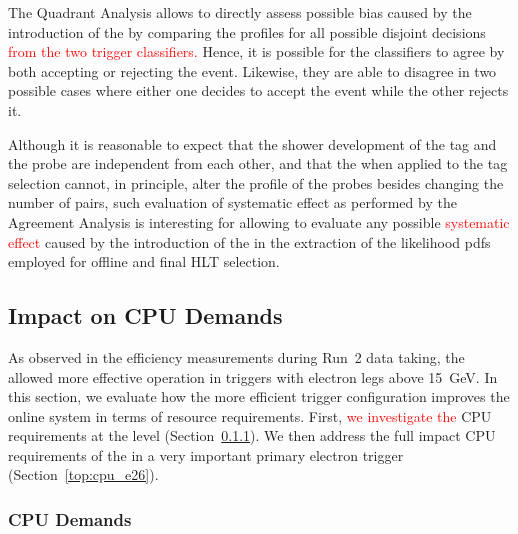The Quadrant Analysis allows to directly assess possible bias caused by the
introduction of the \rnn{} by comparing the profiles for all possible disjoint
decisions \textcolor{red}{from the two trigger classifiers.} Hence, it is possible for the classifiers
to agree by both accepting or rejecting the event. Likewise, they are able to
disagree in two possible cases where either one decides to accept the event
while the other rejects it.

Although it is reasonable to expect that the shower development of the tag and
the probe are independent from each other, and that the \rnn{} when applied to
the tag selection cannot, in principle, alter the profile of the probes besides
changing the number of \tnp{} pairs, such evaluation of systematic effect as
performed by the Agreement Analysis is interesting for allowing to evaluate any
possible \textcolor{red}{systematic effect} caused by the introduction of the \rnn{} in the extraction of the
likelihood pdfs employed for offline and final HLT selection.

\FloatBarrier
\subsection{Impact on CPU Demands}\label{ssec:cpu_reduction}

As observed in the efficiency measurements during Run~2 data taking, the \rnn{}
allowed more effective \fastcalo{} operation in triggers with electron legs
above \SI{15}{\GeV}. In this section, we evaluate how the more efficient trigger
configuration improves the online system in terms of resource requirements.
First, \textcolor{red}{we investigate the} CPU requirements at the \fastcalo{}
level (Section~\ref{top:fastcalo_cpu}). We then address the full impact CPU
requirements of the \rnn{} in a very important primary electron trigger
(Section~\ref{top:cpu_e26}).

\subsubsection{\fastcalo{} CPU Demands}\label{top:fastcalo_cpu}


